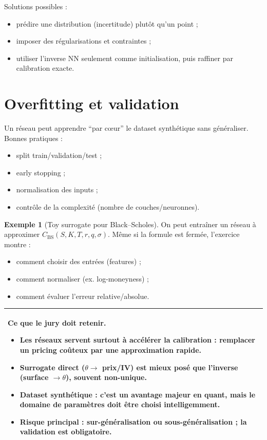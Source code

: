 \documentclass[11pt,a4paper]{report}
\newcommand{\1}{\mathbbm{1}}
\theoremstyle{definition}
\newtheorem{example}{Exemple}[chapter]
\theoremstyle{plain}
\theoremstyle{remark}
\newenvironment{jurybox}{%
  \begin{center}
  \setlength{\tabcolsep}{6pt}%
  \renewcommand{\arraystretch}{1.1}%
  \begin{tabular}{|p{0.94\textwidth}|}
  \hline
  \small\textbf{Ce que le jury doit retenir.}\par\medskip
}{%
  \\ \hline
  \end{tabular}
  \end{center}
}
\begin{document}
Solutions possibles :
\begin{itemize}
  \item prédire une distribution (incertitude) plutôt qu'un point ;
  \item imposer des régularisations et contraintes ;
  \item utiliser l'inverse NN seulement comme initialisation, puis raffiner par calibration exacte.
\end{itemize}

\section{Overfitting et validation}
Un réseau peut apprendre ``par cœur'' le dataset synthétique sans généraliser.
Bonnes pratiques :
\begin{itemize}
  \item split train/validation/test ;
  \item early stopping ;
  \item normalisation des inputs ;
  \item contrôle de la complexité (nombre de couches/neuronnes).
\end{itemize}

\begin{example}[Toy surrogate pour Black--Scholes]
On peut entraîner un réseau à approximer $C_{\mathrm{BS}}(S,K,T,r,q,\sigma)$.
Même si la formule est fermée, l'exercice montre :
\begin{itemize}
  \item comment choisir des entrées (features) ;
  \item comment normaliser (ex. log-moneyness) ;
  \item comment évaluer l'erreur relative/absolue.
\end{itemize}
\end{example}

\begin{jurybox}
\begin{itemize}
\item Les réseaux servent surtout à accélérer la calibration : remplacer un pricing coûteux par une approximation rapide.
\item Surrogate direct ($\theta\to$ prix/IV) est mieux posé que l'inverse (surface $\to \theta$), souvent non-unique.
\item Dataset synthétique : c'est un avantage majeur en quant, mais le domaine de paramètres doit être choisi intelligemment.
\item Risque principal : sur-généralisation ou sous-généralisation ; la validation est obligatoire.
\end{itemize}
\end{jurybox}
\end{document}
